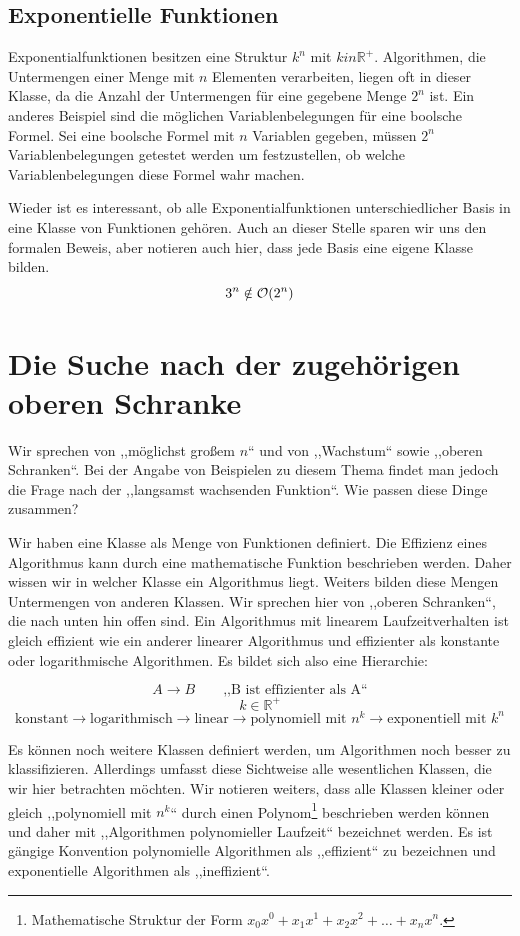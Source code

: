 \subsection{Exponentielle Funktionen}
%
Exponentialfunktionen besitzen eine Struktur $k^n$ mit $k in \mathbb{R}^+$. Algorithmen, die Untermengen einer Menge mit $n$ Elementen verarbeiten, liegen oft in dieser Klasse, da die Anzahl der Untermengen für eine gegebene Menge $2^n$ ist. Ein anderes Beispiel sind die möglichen Variablenbelegungen für eine boolsche Formel. Sei eine boolsche Formel mit $n$ Variablen gegeben, müssen $2^n$ Variablenbelegungen getestet werden um festzustellen, ob welche Variablenbelegungen diese Formel wahr machen.

Wieder ist es interessant, ob alle Exponentialfunktionen unterschiedlicher Basis in eine Klasse von Funktionen gehören. Auch an dieser Stelle sparen wir uns den formalen Beweis, aber notieren auch hier, dass jede Basis eine eigene Klasse bilden.
\[
  3^n \notin \mathcal{O}\!\left(2^n\right)
\]
%
\section{Die Suche nach der zugehörigen oberen Schranke}
%
Wir sprechen von ,,möglichst großem $n$`` und von ,,Wachstum`` sowie ,,oberen Schranken``. Bei der Angabe von Beispielen zu diesem Thema findet man jedoch die Frage nach der ,,langsamst wachsenden Funktion``. Wie passen diese Dinge zusammen?

Wir haben eine Klasse als Menge von Funktionen definiert. Die Effizienz eines Algorithmus kann durch eine mathematische Funktion beschrieben werden. Daher wissen wir in welcher Klasse ein Algorithmus liegt. Weiters bilden diese Mengen Untermengen von anderen Klassen. Wir sprechen hier von ,,oberen Schranken``, die nach unten hin offen sind. Ein Algorithmus mit linearem Laufzeitverhalten ist gleich effizient wie ein anderer linearer Algorithmus und effizienter als konstante oder logarithmische Algorithmen. Es bildet sich also eine Hierarchie:

\[
  A \rightarrow B \qquad \text{,,B ist effizienter als A``}
\] \[
  k \in \mathbb{R}^+
\] \[
  \text{konstant} \rightarrow
  \text{logarithmisch} \rightarrow
  \text{linear} \rightarrow
  \text{polynomiell mit $n^k$} \rightarrow
  \text{exponentiell mit $k^n$}
\]

Es können noch weitere Klassen definiert werden, um Algorithmen noch besser zu klassifizieren. Allerdings umfasst diese Sichtweise alle wesentlichen Klassen, die wir hier betrachten möchten. Wir notieren weiters, dass alle Klassen kleiner oder gleich ,,polynomiell mit $n^k$`` durch einen Polynom\footnote{Mathematische Struktur der Form $x_0x^0 + x_1x^1 + x_2x^2 + \ldots + x_nx^n$.} beschrieben werden können und daher mit ,,Algorithmen polynomieller Laufzeit`` bezeichnet werden. Es ist gängige Konvention polynomielle Algorithmen als ,,effizient`` zu bezeichnen und exponentielle Algorithmen als ,,ineffizient``.

